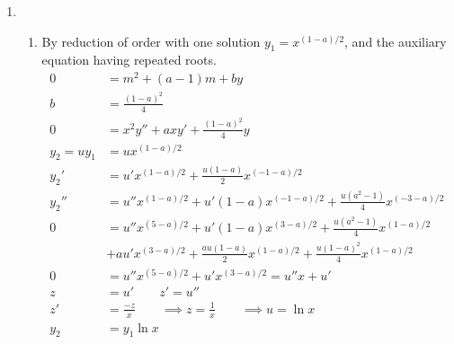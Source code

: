 \begin{enumerate}
    \item \begin{enumerate}
              \item By reduction of order with one solution $y_{1} = x^{(1-a)/2}$, and
                    the auxiliary equation having repeated roots.
                    \begin{align}
                        0              & = m^{2} + (a-1)m + by                     \\
                        b              & = \frac{(1-a)^{2}}{4}                     \\
                        0              & = x^{2}y'' + axy' + \frac{(1-a)^{2}}{4}y  \\
                        y_{2} = uy_{1} & = ux^{(1-a)/2}                            \\
                        y_{2}'         & = u'x^{(1-a)/2}
                        + \frac{u(1-a)}{2}x^{(-1-a)/2}                             \\
                        y_{2}''        & = u''x^{(1-a)/2}
                        + u'(1-a)x^{(-1-a)/2} + \frac{u(a^{2} - 1)}{4}x^{(-3-a)/2} \\
                        0              & = u''x^{(5-a)/2}
                        + u'(1-a)x^{(3-a)/2} + \frac{u(a^{2} - 1)}{4}x^{(1-a)/2}   \\
                                       & + au'x^{(3-a)/2}
                        + \frac{au(1-a)}{2}x^{(1-a)/2}  + \frac{u(1-a)^{2}}{4}
                        x^{(1-a)/2}                                                \\
                        0              & = u'' x^{(5-a)/2}
                        + u' x^{(3-a)/2} = u''x + u'                               \\
                        z              & = u' \qquad z' = u''                      \\
                        z'             & = \frac{-z}{x}  \qquad \implies z
                        = \frac{1}{x} \qquad \implies u = \ln x                    \\
                        y_{2}          & = y_{1}\ln x
                    \end{align}


\end{enumerate}
\end{enumerate}
